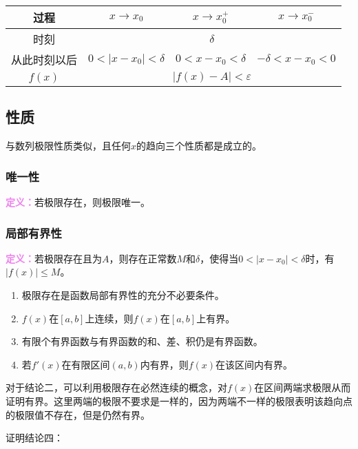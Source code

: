 \documentclass[UTF8, 12pt]{ctexart}
\begin{document}
\begin{center}
    \begin{tabular}{|c|c|c|c|}
        \hline
        过程 & $x\to x_0$ & $x\to x_0^+$ & $x\to x_0^-$ \\ \hline
        时刻 & \multicolumn{3}{c|}{$\delta$} \\ \hline
        从此时刻以后 & $0<\vert x-x_0\vert<\delta$ & $0<x-x_0<\delta$ & $-\delta<x-x_0<0$\\ \hline
        $f(x)$ & \multicolumn{3}{c|}{$\vert f(x)-A\vert<\varepsilon$} \\ 
        \hline
    \end{tabular}
\end{center}

\subsection{性质}

与数列极限性质类似，且任何$x$的趋向三个性质都是成立的。

\subsubsection{唯一性}

\textcolor{violet}{\textbf{定义：}}若极限存在，则极限唯一。

\subsubsection{局部有界性}

\textcolor{violet}{\textbf{定义：}}若极限存在且为$A$，则存在正常数$M$和$\delta$，使得当$0<\vert x-x_0\vert<\delta$时，有$\vert f(x)\vert\leqslant M$。

\begin{enumerate}
    \item 极限存在是函数局部有界性的充分不必要条件。
    \item $f(x)$在$[a,b]$上连续，则$f(x)$在$[a,b]$上有界。
    \item 有限个有界函数与有界函数的和、差、积仍是有界函数。
    \item 若$f'(x)$在有限区间$(a,b)$内有界，则$f(x)$在该区间内有界。
\end{enumerate}

对于结论二，可以利用极限存在必然连续的概念，对$f(x)$在区间两端求极限从而证明有界。这里两端的极限不要求是一样的，因为两端不一样的极限表明该趋向点的极限值不存在，但是仍然有界。

证明结论四：
\end{document}
